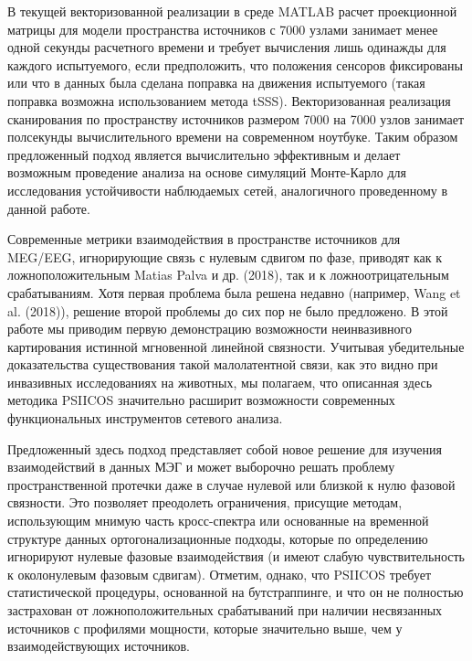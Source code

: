 В текущей векторизованной реализации в среде MATLAB расчет проекционной матрицы
для модели пространства источников с 7000 узлами занимает менее одной секунды
расчетного времени и требует вычисления лишь одинажды для каждого испытуемого,
если предположить, что положения сенсоров фиксированы или что в данных была
сделана поправка на движения испытуемого (такая поправка возможна
использованием метода tSSS).  Векторизованная реализация сканирования по
пространству источников размером 7000 на 7000 узлов занимает полсекунды
вычислительного времени на современном ноутбуке.  Таким образом предложенный
подход является вычислительно эффективным и делает возможным проведение анализа
на основе симуляций Монте-Карло для исследования устойчивости наблюдаемых
сетей, аналогичного проведенному в данной работе.

Современные метрики взаимодействия в пространстве источников для MEG/EEG,
игнорирующие связь с нулевым сдвигом по фазе, приводят как к ложноположительным
Matias Palva и др. (2018), так и к ложноотрицательным срабатываниям. Хотя первая проблема была
решена недавно (например, Wang et al. (2018)), решение второй проблемы до сих
пор не было предложено. В этой работе мы приводим первую демонстрацию
возможности неинвазивного картирования истинной мгновенной линейной связности.
Учитывая убедительные доказательства существования такой малолатентной связи,
как это видно при инвазивных исследованиях на животных, мы полагаем, что
описанная здесь методика PSIICOS значительно расширит возможности современных
функциональных инструментов сетевого анализа.


Предложенный здесь подход представляет собой новое решение для изучения
взаимодействий в данных МЭГ и может выборочно решать проблему пространственной
протечки даже в случае нулевой или близкой к нулю фазовой связности. Это
позволяет преодолеть ограничения, присущие методам, использующим мнимую часть
кросс-спектра или основанные на временной структуре данных ортогонализационные
подходы, которые по определению игнорируют нулевые фазовые взаимодействия (и
имеют слабую чувствительность к околонулевым фазовым сдвигам). Отметим, однако,
что PSIICOS требует статистической процедуры, основанной на бутстраппинге, и
что он не полностью застрахован от ложноположительных срабатываний при наличии
несвязанных источников с профилями мощности, которые значительно выше, чем у
взаимодействующих источников.


